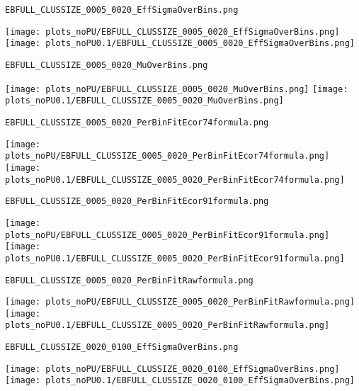 \begin{frame}[fragile]
\begin{verbatim}
EBFULL_CLUSSIZE_0005_0020_EffSigmaOverBins.png
\end{verbatim}
\texttt{[image: plots\_noPU/EBFULL\_CLUSSIZE\_0005\_0020\_EffSigmaOverBins.png]}
\texttt{[image: plots\_noPU0.1/EBFULL\_CLUSSIZE\_0005\_0020\_EffSigmaOverBins.png]}
\end{frame}
\begin{frame}[fragile]
\begin{verbatim}
EBFULL_CLUSSIZE_0005_0020_MuOverBins.png
\end{verbatim}
\texttt{[image: plots\_noPU/EBFULL\_CLUSSIZE\_0005\_0020\_MuOverBins.png]}
\texttt{[image: plots\_noPU0.1/EBFULL\_CLUSSIZE\_0005\_0020\_MuOverBins.png]}
\end{frame}
\begin{frame}[fragile]
\begin{verbatim}
EBFULL_CLUSSIZE_0005_0020_PerBinFitEcor74formula.png
\end{verbatim}
\texttt{[image: plots\_noPU/EBFULL\_CLUSSIZE\_0005\_0020\_PerBinFitEcor74formula.png]}
\texttt{[image: plots\_noPU0.1/EBFULL\_CLUSSIZE\_0005\_0020\_PerBinFitEcor74formula.png]}
\end{frame}
\begin{frame}[fragile]
\begin{verbatim}
EBFULL_CLUSSIZE_0005_0020_PerBinFitEcor91formula.png
\end{verbatim}
\texttt{[image: plots\_noPU/EBFULL\_CLUSSIZE\_0005\_0020\_PerBinFitEcor91formula.png]}
\texttt{[image: plots\_noPU0.1/EBFULL\_CLUSSIZE\_0005\_0020\_PerBinFitEcor91formula.png]}
\end{frame}
\begin{frame}[fragile]
\begin{verbatim}
EBFULL_CLUSSIZE_0005_0020_PerBinFitRawformula.png
\end{verbatim}
\texttt{[image: plots\_noPU/EBFULL\_CLUSSIZE\_0005\_0020\_PerBinFitRawformula.png]}
\texttt{[image: plots\_noPU0.1/EBFULL\_CLUSSIZE\_0005\_0020\_PerBinFitRawformula.png]}
\end{frame}
\begin{frame}[fragile]
\begin{verbatim}
EBFULL_CLUSSIZE_0020_0100_EffSigmaOverBins.png
\end{verbatim}
\texttt{[image: plots\_noPU/EBFULL\_CLUSSIZE\_0020\_0100\_EffSigmaOverBins.png]}
\texttt{[image: plots\_noPU0.1/EBFULL\_CLUSSIZE\_0020\_0100\_EffSigmaOverBins.png]}
\end{frame}
